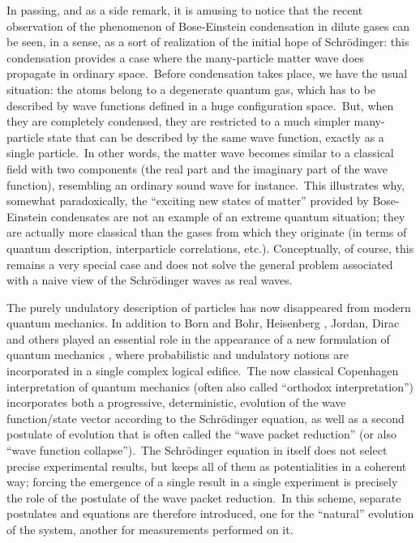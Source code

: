 \documentclass[12pt,onecolumn]{article}%
\begin{document}
In passing, and as a side remark, it is amusing to notice that the recent
observation of the phenomenon of Bose-Einstein condensation in dilute gases
\cite{BEC} can be seen, in a sense, as a sort of realization of the initial
hope of Schr\"{o}dinger: this condensation provides a case where the
many-particle matter wave does propagate in ordinary space.\ Before
condensation takes place, we have the usual situation: the atoms belong to a
degenerate quantum gas, which has to be described by wave functions defined in
a huge configuration space.\ But, when they are completely condensed, they are
restricted to a much simpler many-particle state that can be described by the
same wave function, exactly as a single particle.\ In other words, the matter
wave becomes similar to a classical field with two components (the real part
and the imaginary part of the wave function), resembling an ordinary sound
wave for instance.\ This illustrates why, somewhat paradoxically, the
``exciting new states of matter'' provided by Bose-Einstein condensates are
not an example of an extreme quantum situation; they are actually more
classical than the gases from which they originate (in terms of quantum
description, interparticle correlations, etc.). Conceptually, of course, this
remains a very special case and does not solve the general problem associated
with a naive view of the Schr\"{o}dinger waves as real waves.

The purely undulatory description of particles has now disappeared from modern
quantum mechanics. In addition to Born and Bohr, Heisenberg \cite{Heisenberg},
Jordan, Dirac \cite{Dirac} and others played an essential role in the
appearance of a new formulation of quantum mechanics \cite{Darrigol-1}, where
probabilistic and undulatory notions are incorporated in a single complex
logical edifice.\ The now classical Copenhagen interpretation of quantum
mechanics (often also called ``orthodox interpretation'') incorporates both a
progressive, deterministic, evolution of the wave function/state vector
according to the Schr\"{o}dinger equation, as well as a second postulate of
evolution that is often called the ``wave packet reduction'' (or also ``wave
function collapse'').\ The Schr\"{o}dinger equation in itself does not select
precise experimental results, but keeps all of them as potentialities in a
coherent way; forcing the emergence of a single result in a single experiment
is precisely the role of the postulate of the wave packet reduction.\ In this
scheme, separate postulates and equations are therefore introduced, one for
the ``natural'' evolution of the system, another for measurements performed on it.
\end{document}
